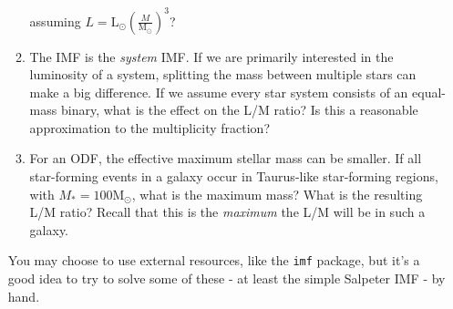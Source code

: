 \documentclass[twoside]{tufte-book} %
\newcommand{\msun}{\ensuremath{\mathrm{M}_\odot}\xspace}
\newcommand{\lsun}{\ensuremath{\mathrm{L}_\odot}\xspace}
\begin{document}
\begin{enumerate}
\begin{enumerate}
            assuming $L = \lsun \left(\frac{M}{\msun}\right)^{3}$?
        \item The IMF is the \emph{system} IMF.  If we are primarily interested
            in the luminosity of a system, splitting the mass between multiple
            stars can make a big difference.  If we assume every star system
            consists of an equal-mass binary, what is the effect on the L/M ratio?
            Is this a reasonable approximation to the multiplicity fraction?
        \item For an ODF, the effective maximum stellar mass can be smaller.
            If all star-forming events in a galaxy occur in Taurus-like
            star-forming regions, with $M_*=100\msun$, what is the maximum
            mass?  What is the resulting L/M ratio?  Recall that this is
            the \emph{maximum} the L/M will be in such a galaxy.
    \end{enumerate}

    You may choose to use external resources, like the \texttt{imf} package,
    but it's a good idea to try to solve some of these - at least the simple
    Salpeter IMF - by hand.

\end{enumerate}
\end{document}
